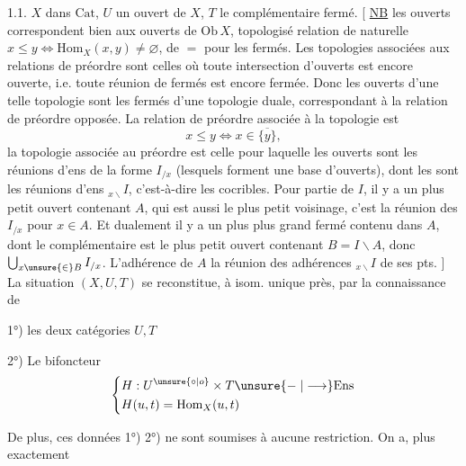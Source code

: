 1.1.   $X$ dans $\mathrm{Cat}$, $U$ un ouvert de $X$, $T$ le complémentaire fermé.
[ \uline{NB} les ouverts correspondent bien aux ouverts de $\mathrm{Ob}\,X$, topologisé   relation de   naturelle $x\leq y\Longleftrightarrow\mathrm{Hom}_X(x,y)\ne\varnothing$, de $=$ pour les fermés.
Les topologies associées aux relations de préordre sont celles où toute intersection d'ouverts est encore ouverte, i.e. toute réunion de fermés est encore fermée. Donc les ouverts d'une telle topologie sont les fermés d'une topologie duale, correspondant à la relation de préordre opposée. La relation de préordre associée à la topologie est
\[
x\leq y\Longleftrightarrow x\in\overline{\{y\}},
\]
la topologie associée au préordre  est celle pour laquelle les ouverts sont les réunions d'ens de la forme $I_{/x}$ (lesquels forment une base d'ouverts),  dont les  sont les réunions d'ens $ {}_{x\backslash}I$, c'est-à-dire les cocribles.
Pour  partie   de $I$, il y a un plus petit ouvert contenant $A$, qui est aussi le plus petit voisinage, c'est la réunion des  $I_{/x}$ pour $x\in A$. Et dualement il y a un plus plus grand fermé contenu dans $A$, dont le complémentaire est le plus petit ouvert contenant $B=I\backslash A$, donc $\bigcup_{x\unsure{\in} B}I_{/x}$. L'adhérence de $A$  la réunion des adhérences  $ {}_{x\backslash}I$ de ses pts. ]
La situation $(X,U,T)$ se reconstitue, à isom. unique près, par la connaissance de

1°) les deux catégories $U,T$

2°) Le bifoncteur
\[
\left\{\begin{aligned} &H:U^{\unsure{\circ|o}}\times T\unsure{\relbar|\longrightarrow}\mathrm{Ens}\\ &H(u,t)=\mathrm{Hom}_X(u,t)\end{aligned}\right.
\]

De plus, ces données 1°) 2°) ne sont soumises à aucune restriction. On a, plus exactement

